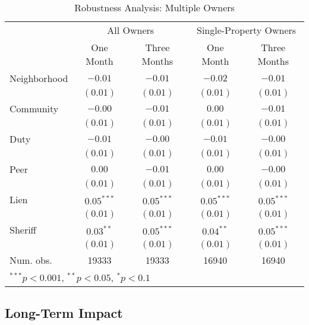\documentclass[12pt]{article}
\begin{document}
\begin{table}
\caption{Robustness Analysis: Multiple Owners}
\begin{center}
\begin{tabular}{l c c c c }
\hline
 & \multicolumn{2}{c}{All Owners} & \multicolumn{2}{c}{Single-Property Owners} \\
          & One Month & Three Months & One Month & Three Months \\
\hline
Neighborhood & $-0.01$      & $-0.01$      & $-0.02$      & $-0.01$      \\
          & $(0.01)$     & $(0.01)$     & $(0.01)$     & $(0.01)$     \\
Community     & $-0.00$      & $-0.01$      & $0.00$       & $-0.01$      \\
          & $(0.01)$     & $(0.01)$     & $(0.01)$     & $(0.01)$     \\
Duty      & $-0.01$      & $-0.00$      & $-0.01$      & $-0.00$      \\
          & $(0.01)$     & $(0.01)$     & $(0.01)$     & $(0.01)$     \\
Peer      & $0.00$       & $-0.01$      & $0.00$       & $-0.00$      \\
          & $(0.01)$     & $(0.01)$     & $(0.01)$     & $(0.01)$     \\
Lien      & $0.05^{***}$ & $0.05^{***}$ & $0.05^{***}$ & $0.05^{***}$ \\
          & $(0.01)$     & $(0.01)$     & $(0.01)$     & $(0.01)$     \\
Sheriff   & $0.03^{**}$  & $0.05^{***}$ & $0.04^{**}$  & $0.05^{***}$ \\
          & $(0.01)$     & $(0.01)$     & $(0.01)$     & $(0.01)$     \\
\hline
Num. obs. & 19333        & 19333        & 16940        & 16940        \\
\hline
\multicolumn{5}{l}{\scriptsize{$^{***}p<0.001$, $^{**}p<0.05$, $^*p<0.1$}}
\end{tabular}
\label{sh_lpm_rob}
\end{center}
\end{table}


\subsection{Long-Term Impact}
\end{document}
